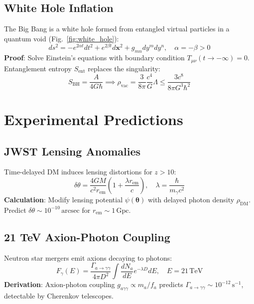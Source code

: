 \documentclass[12pt, a4paper]{article}
\begin{document}
\subsection{White Hole Inflation}
\label{subsec:inflation}
The Big Bang is a white hole formed from entangled virtual particles in a quantum void (Fig.~\ref{fig:white_hole}):
\begin{equation}
ds^2 = -e^{2\alpha t} dt^2 + e^{2\beta t} d\bm{x}^2 + g_{mn} dy^m dy^n, \quad \alpha = -\beta > 0
\label{eq:metric}
\end{equation}
\textbf{Proof}: Solve Einstein’s equations with boundary condition \( T_{\mu\nu}(t \to -\infty) = 0 \). Entanglement entropy \( S_{\text{ent}} \) replaces the singularity:
\begin{equation}
S_{\text{BH}} = \frac{A}{4G\hbar} \implies \rho_{\text{vac}} = \frac{3}{8\pi} \frac{c^4}{G} \Lambda \leq \frac{3c^8}{8\pi G^3 \hbar^2}
\label{eq:entropy_bound}
\end{equation}

\section{Experimental Predictions}
\label{sec:experiments}

\subsection{JWST Lensing Anomalies}
\label{subsec:lensing}
Time-delayed DM induces lensing distortions for \( z > 10 \):
\begin{equation}
\delta \theta = \frac{4GM}{c^2 r_{\text{em}}} \left(1 + \frac{\lambda r_{\text{em}}}{c}\right), \quad \lambda = \frac{\hbar}{m_\gamma c^2}
\label{eq:lensing}
\end{equation}
\textbf{Calculation}: Modify lensing potential \( \psi(\bm{\theta}) \) with delayed photon density \( \rho_{\text{DM}} \). Predict \( \delta \theta \sim 10^{-10} \, \text{arcsec} \) for \( r_{\text{em}} \sim 1 \, \text{Gpc} \).

\subsection{21 TeV Axion-Photon Coupling}
\label{subsec:axion}
Neutron star mergers emit axions decaying to photons:
\begin{equation}
F_{\gamma}(E) = \frac{\Gamma_{a \to \gamma\gamma}}{4\pi D^2} \int \frac{dN_a}{dE} e^{-\lambda D} dE, \quad E = 21 \, \text{TeV}
\label{eq:axion_flux}
\end{equation}
\textbf{Derivation}: Axion-photon coupling \( g_{a\gamma\gamma} \propto m_a / f_a \) predicts \( \Gamma_{a \to \gamma\gamma} \sim 10^{-12} \, \text{s}^{-1} \), detectable by Cherenkov telescopes.
\end{document}
